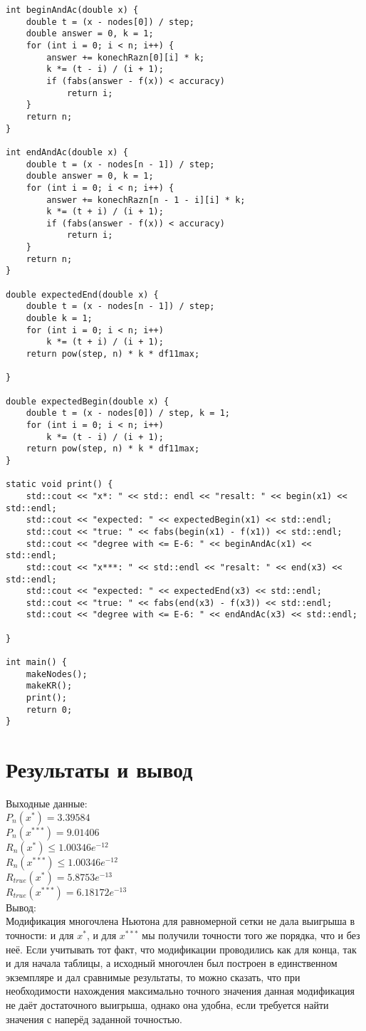 \documentclass[10pt]{scrartcl}
\begin{document}
\begin{verbatim}
int beginAndAc(double x) {
    double t = (x - nodes[0]) / step;
    double answer = 0, k = 1;
    for (int i = 0; i < n; i++) {
        answer += konechRazn[0][i] * k;
        k *= (t - i) / (i + 1);
        if (fabs(answer - f(x)) < accuracy)
            return i;
    }
    return n;
}

int endAndAc(double x) {
    double t = (x - nodes[n - 1]) / step;
    double answer = 0, k = 1;
    for (int i = 0; i < n; i++) {
        answer += konechRazn[n - 1 - i][i] * k;
        k *= (t + i) / (i + 1);
        if (fabs(answer - f(x)) < accuracy)
            return i;
    }
    return n;
}

double expectedEnd(double x) {
    double t = (x - nodes[n - 1]) / step;
    double k = 1;
    for (int i = 0; i < n; i++)
        k *= (t + i) / (i + 1);
    return pow(step, n) * k * df11max;

}

double expectedBegin(double x) {
    double t = (x - nodes[0]) / step, k = 1;
    for (int i = 0; i < n; i++)
        k *= (t - i) / (i + 1);
    return pow(step, n) * k * df11max;
}

static void print() {
    std::cout << "x*: " << std:: endl << "resalt: " << begin(x1) << std::endl;
    std::cout << "expected: " << expectedBegin(x1) << std::endl;
    std::cout << "true: " << fabs(begin(x1) - f(x1)) << std::endl;
    std::cout << "degree with <= E-6: " << beginAndAc(x1) << std::endl;
    std::cout << "x***: " << std::endl << "resalt: " << end(x3) << std::endl;
    std::cout << "expected: " << expectedEnd(x3) << std::endl;
    std::cout << "true: " << fabs(end(x3) - f(x3)) << std::endl;
    std::cout << "degree with <= E-6: " << endAndAc(x3) << std::endl;

}

int main() {
    makeNodes();
    makeKR();
    print();
    return 0;
}
\end{verbatim}
\section*{Результаты и вывод}\noindent
Выходные данные:\\
$P_n(x^*) = 3.39584$\\
$P_n(x^{***})= 9.01406$\\
$R_n(x^*) \leq 1.00346e^{-12}$\\
$R_n(x^{***}) \leq 1.00346e^{-12}$\\
$R_{true}(x^*) = 5.8753e^{-13}$\\
$R_{true}(x^{***}) = 6.18172e^{-13}$\\
Вывод:\\
Модификация многочлена Ньютона для равномерной сетки не дала выигрыша в точности: и для $x^*$, и для $x^{***}$ мы получили точности того же порядка, что и без неё. Если учитывать тот факт, что модификации проводились как для конца, так и для начала таблицы, а исходный многочлен был построен в единственном экземпляре и дал сравнимые результаты, то можно сказать, что при
необходимости нахождения максимально точного значения данная модификация не даёт достаточного выигрыша, однако она удобна, если требуется найти значения с наперёд заданной точностью.
\end{document}
